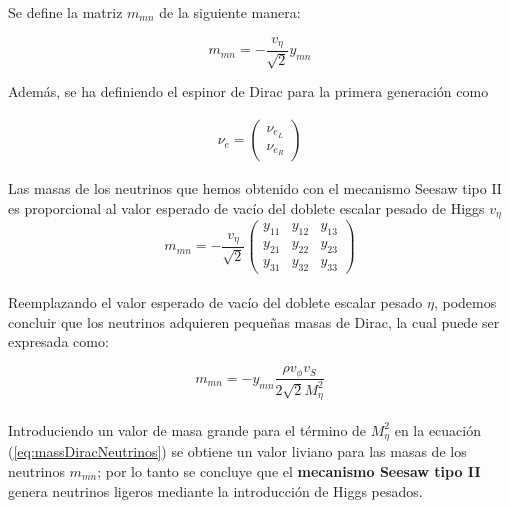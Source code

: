 \documentclass[12pt]{article}
\begin{document}
Se define la matriz $m_{mn}$ de la siguiente manera: 

\begin{equation}
    \label{eq:massneutrinostres}
    m_{mn}=-\frac{v_\eta}{\sqrt{2}} y_{mn}
\end{equation}

Además, se ha definiendo el espinor de Dirac para la primera generación como

\begin{align}
\nu_e =\begin{pmatrix}
 \nu_{e_L}\\
 \nu_{e_R}
\end{pmatrix}
\end{align}



Las masas de los neutrinos que hemos obtenido con el mecanismo
Seesaw tipo II es proporcional al valor esperado de vacío del doblete escalar pesado de Higgs  $v_\eta $ \\

\begin{equation}
    m_{mn} = -\frac{v_\eta}{\sqrt{2}} \begin{pmatrix}     y_{11} &  y_{12} & y_{13} \\
         y_{21} &  y_{22} & y_{23}  \\
         y_{31} &  y_{32} & y_{33}  \end{pmatrix}
       \label{eq:111}  
\end{equation} \\



Reemplazando el valor esperado de vacío  del doblete escalar pesado $\eta$, podemos concluir que  los neutrinos adquieren pequeñas masas de Dirac, la cual puede ser expresada como:



 \begin{equation}
      \label{eq:massDiracNeutrinos}
     m_{mn}  = -y_{mn} \frac{ \rho v_\phi v_S }{2\sqrt{2}M^{2}_\eta}
 \end{equation} \\

Introduciendo un valor de masa grande para el término de \( M^{2}_\eta \) en la ecuación (\ref{eq:massDiracNeutrinos}) se obtiene un valor liviano para las masas de los neutrinos \(  m_{mn} \); por lo tanto se concluye que el \textbf{mecanismo Seesaw tipo II} genera neutrinos ligeros mediante la introducción de Higgs pesados. 
\end{document}
